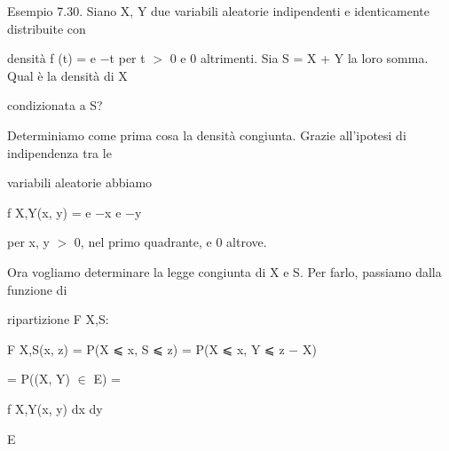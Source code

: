 \documentclass[a4paper,portrait,12pt]{article}
\begin{document}
\begin{flushleft}
Esempio 7.30. Siano X, Y due variabili aleatorie indipendenti e identicamente distribuite con
\end{flushleft}


\begin{flushleft}
densit\`{a} f (t) = e $-$t per t $>$ 0 e 0 altrimenti. Sia S = X + Y la loro somma. Qual \`{e} la densit\`{a} di X
\end{flushleft}


\begin{flushleft}
condizionata a S?
\end{flushleft}


\begin{flushleft}
Determiniamo come prima cosa la densit\`{a} congiunta. Grazie all'ipotesi di indipendenza tra le
\end{flushleft}


\begin{flushleft}
variabili aleatorie abbiamo
\end{flushleft}


\begin{flushleft}
f X,Y(x, y) = e $-$x e $-$y
\end{flushleft}


\begin{flushleft}
per x, y $>$ 0, nel primo quadrante, e 0 altrove.
\end{flushleft}


\begin{flushleft}
Ora vogliamo determinare la legge congiunta di X e S. Per farlo, passiamo dalla funzione di
\end{flushleft}


\begin{flushleft}
ripartizione F X,S:
\end{flushleft}


\begin{flushleft}
F X,S(x, z) = P(X ⩽ x, S ⩽ z) = P(X ⩽ x, Y ⩽ z $-$ X)
\end{flushleft}


\begin{flushleft}
= P((X, Y) $\in$ E) =
\end{flushleft}


\begin{flushleft}
f X,Y(x, y) dx dy
\end{flushleft}


\begin{flushleft}
E
\end{flushleft}
\end{document}
